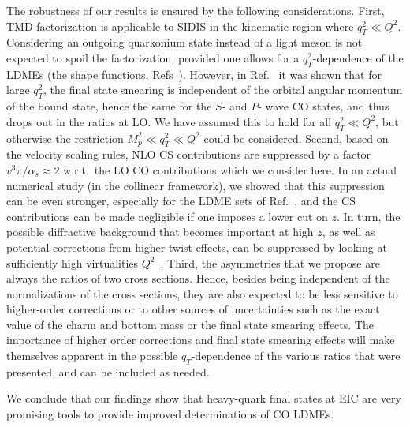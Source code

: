 \documentclass[prd,aps,preprintnumbers,nofootinbib,superscriptaddress]{revtex4}
\newcommand{\sT}{{\scriptscriptstyle T}}
\begin{document}
The robustness of our results is ensured by the following considerations. First, TMD factorization is applicable to SIDIS in the kinematic region where $q_\sT^2\ll Q^2$. Considering an outgoing quarkonium state instead of a light meson is not expected to spoil the factorization, provided one allows for a $q_\sT^2$-dependence of the LDMEs (the shape functions, Refs~\cite{Echevarria:2019ynx,Fleming:2019pzj,Boer:2020bbd}).
However, in Ref.~\cite{Boer:2020bbd} it was shown that for large $q_\sT^2$, the final state smearing is independent of the orbital angular momentum of the bound state, hence the same for the $S$- and $P$- wave CO states, and thus drops out in the ratios at LO. We have assumed this to hold for all $q_\sT^2\ll Q^2$, but otherwise the restriction $M_p^2 \ll q_\sT^2\ll Q^2$ could be considered.
Second, based on the velocity scaling rules, NLO CS contributions are suppressed by a factor $v^3 \pi/\alpha_s \approx 2$ w.r.t.\ the LO CO contributions which we consider here. In an actual numerical study (in the collinear framework), we showed that this suppression can be even stronger, especially for the LDME sets of Ref.~\cite{Sharma:2012dy}, and the CS contributions can be made negligible if one imposes a lower cut on $z$. In turn, the possible diffractive background that becomes important at high $z$, as well as potential corrections from higher-twist effects,  can be suppressed by looking at sufficiently high virtualities $Q^2$~\cite{Fleming:1997fq}. Third, the asymmetries that we propose are always the ratios of two cross sections. Hence, besides
being independent of the normalizations of the cross sections, they are also expected to be less sensitive to higher-order corrections or to other sources of uncertainties such as the exact value of the charm and bottom mass or the final state smearing effects.  
The importance of higher order corrections and final state smearing effects will make themselves apparent in the possible $q_\sT$-dependence of the various ratios that were presented, and can be included as needed.

We conclude that our findings show that heavy-quark final states at EIC are very promising tools to provide improved determinations of CO LDMEs.
\end{document}
